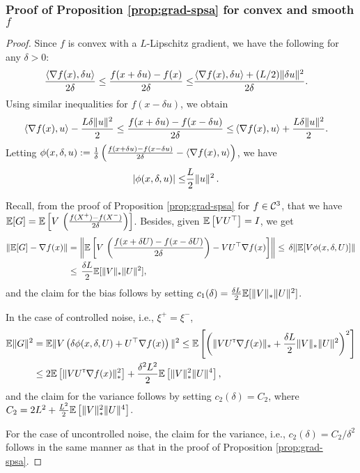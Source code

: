 \subsubsection*{Proof of Proposition \ref{prop:grad-spsa} for convex and smooth $f$}
\begin{proof}
Since $f$ is convex with a  $L$-Lipschitz gradient, we have the following for any $\delta>0$:
\begin{align*}
\frac{\left\langle\nabla f(x), \delta u\right\rangle}{2\delta} \le \frac{f(x + \delta u) -  f(x)}{2\delta} \le& \frac{\left\langle\nabla f(x), \delta u\right\rangle + (L / 2) \|\delta u\|^2}{2\delta}.
\end{align*}
Using similar inequalities for $f(x-\delta u)$, we obtain
\begin{align*}
\left\langle\nabla f(x), u\right\rangle - \frac{L \delta \| u\|^2}{2} \le \frac{f(x + \delta u) -  f(x-\delta u)}{2\delta} \le& \left\langle\nabla f(x), u\right\rangle + \frac{L \delta \| u\|^2}{2}.
\end{align*}
Letting
$\phi(x,\delta,u):=\frac1{\delta}\left(\frac{f(x + \delta u) -  f(x-\delta u)}{2\delta} - \left\langle\nabla f(x),  u\right\rangle\right)$, we have
\begin{align*}
\left|\phi(x,\delta,u) \right| \le&  \dfrac{L}{2} \|u\|^2\,.
\end{align*}

Recall, from the proof of Proposition \ref{prop:grad-spsa} for $f\in \mathcal{C}^3$, that
we have
$\mathbb{E}[G] =  \mathbb{E}\left[V\,  \left(\tfrac{f(X^+)  -f(X^-)}{2\delta}\right) \right]$. Besides, given $\mathbb{E}\left[V U^\top\right]=I$,  we get
\begin{align*}
 \|\mathbb{E}[G] - \nabla f(x)\|
 &= \left\|\mathbb{E}\left[V\,  \left(\frac{f(x+\delta U)  -f(x-\delta U)}{2\delta}\right)-V U^\top\nabla f(x) \right]\right\|
 \le \, \delta \|\mathbb{E}[ V \phi(x,\delta, U)]\|\\
 &\le \,\frac{\delta L}{2} \mathbb{E}[ \|V\|_* \|U\|^2],
\end{align*}
and the claim for the bias follows by setting $c_1(\delta)= \frac{\delta L}{2} \mathbb{E}[ \|V\|_* \|U\|^2]$.

In the case of controlled noise, i.e., $\xi^+ = \xi^-$,
\begin{align*}
 \mathbb{E} \|G\|^2
& = \mathbb{E}\|V\left(\delta \phi(x,\delta, U)+ U^\top\nabla f(x) \right)\|^2
 \le  \mathbb{E}\left[ \left( \| V U ^\mathsf{\scriptscriptstyle T} \nabla f(x)\|_* + \frac{\delta L}{2} \|V\|_* \|U\|^2 \right)^2\right]\\
& \le  2 \mathbb{E}\left[  \| V U ^\mathsf{\scriptscriptstyle T} \nabla f(x)\|_*^2\right]  + \frac{\delta^2 L^2}{2}\mathbb{E}\left[ \|V\|_*^2 \|U\|^4 \right],
\end{align*}
and the claim for the variance follows by setting $c_2(\delta) = C_2$,
where $C_2 =  2 L^2  + \frac{ L^2}{2}\mathbb{E}\left[ \|V\|_*^2 \|U\|^4 \right]$.

For the case of uncontrolled noise, the claim for the variance, i.e., $c_2(\delta) = C_2/\delta^2$ follows in the same manner as that in the proof of Proposition \ref{prop:grad-spsa}.
\end{proof}


